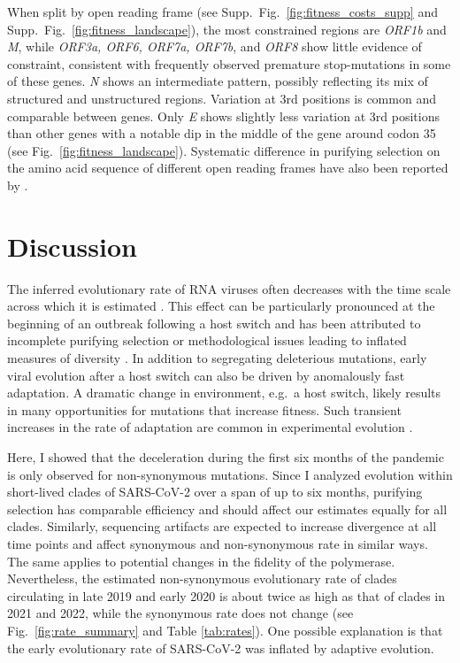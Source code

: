 \documentclass[aps,rmp, twocolumn]{revtex4}
\begin{document}
When split by open reading frame (see Supp.~Fig.~\ref{fig:fitness_costs_supp} and Supp.~Fig.~\ref{fig:fitness_landscape}), the most constrained regions are \emph{ORF1b} and \emph{M}, while \emph{ORF3a, ORF6, ORF7a, ORF7b}, and \emph{ORF8} show little evidence of constraint, consistent with frequently observed premature stop-mutations in some of these genes.
\emph{N} shows an intermediate pattern, possibly reflecting its mix of structured and unstructured regions.
Variation at 3rd positions is common and comparable between genes.
Only \emph{E} shows slightly less variation at 3rd positions than other genes with a notable dip in the middle of the gene around codon 35 (see Fig.~\ref{fig:fitness_landscape}).
Systematic difference in purifying selection on the amino acid sequence of different open reading frames have also been reported by \citet{rochman_ongoing_2021}.


\section*{Discussion}
The inferred evolutionary rate of RNA viruses often decreases with the time scale across which it is estimated \citep{wertheim_purifying_2011,ghafari_prisoner_2021}.
This effect can be particularly pronounced at the beginning of an outbreak following a host switch and has been attributed to incomplete purifying selection or methodological issues leading to inflated measures of diversity \citep{meyer_time_2015,ghafari_purifying_2022}.
In addition to segregating deleterious mutations, early viral evolution after a host switch can also be driven by anomalously fast adaptation.
A dramatic change in environment, e.g.~a host switch, likely results in many opportunities for mutations that increase fitness.
Such transient increases in the rate of adaptation are common in experimental evolution \citep{elena_virus_2007}.

Here, I showed that the deceleration during the first six months of the pandemic is only observed for non-synonymous mutations.
Since I analyzed evolution within short-lived clades of SARS-CoV-2 over a span of up to six months, purifying selection has comparable efficiency and should affect our estimates equally for all clades.
Similarly, sequencing artifacts are expected to increase divergence at all time points and affect synonymous and non-synonymous rate in similar ways.
The same applies to potential changes in the fidelity of the polymerase.
Nevertheless, the estimated non-synonymous evolutionary rate of clades circulating in late 2019 and early 2020 is about twice as high as that of clades in 2021 and 2022, while the synonymous rate does not change (see Fig.~\ref{fig:rate_summary} and Table \ref{tab:rates}).
One possible explanation is that the early evolutionary rate of SARS-CoV-2 was inflated by adaptive evolution.
\end{document}
